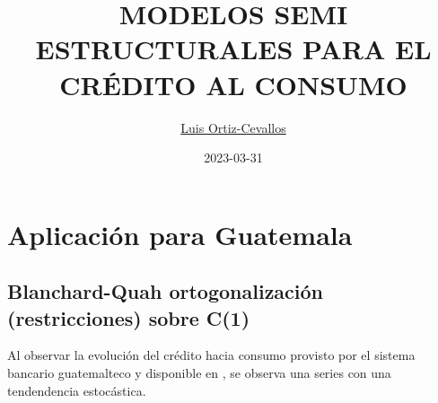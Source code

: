 \documentclass[
]{book}
\title{MODELOS SEMI ESTRUCTURALES PARA EL CRÉDITO AL CONSUMO}
\author{\href{https://ortiz-cevallos.github.io/MYSELF/}{Luis Ortiz-Cevallos}}
\date{2023-03-31}
\begin{document}
\maketitle

{
\setcounter{tocdepth}{1}
\tableofcontents
}
\hypertarget{aplicaciuxf3n-para-guatemala}{%
\chapter{Aplicación para Guatemala}\label{aplicaciuxf3n-para-guatemala}}

\hypertarget{blanchard-quah-ortogonalizaciuxf3n-restricciones-sobre-c1}{%
\section{Blanchard-Quah ortogonalización (restricciones) sobre C(1)}\label{blanchard-quah-ortogonalizaciuxf3n-restricciones-sobre-c1}}

Al observar la evolución del crédito hacia consumo provisto por el sistema bancario guatemalteco y disponible en \citet{SECMCADATOS}, se observa una series con una tendendencia estocástica.
\end{document}
